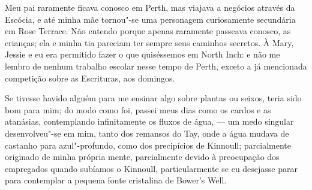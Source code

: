 Meu pai raramente ficava conosco em Perth, mas viajava a negócios
através da Escócia, e até minha mãe tornou"-se uma personagem
curiosamente secundária em Rose Terrace. Não entendo porque apenas
raramente passeava conosco, as crianças; ela e minha tia pareciam ter
sempre seus caminhos secretos. À Mary, Jessie e eu era permitido fazer o
que quiséssemos em North Inch: e não me lembro de nenhum trabalho
escolar nesse tempo de Perth, exceto a já mencionada competição sobre as
Escrituras, aos domingos.

Se tivesse havido alguém para me ensinar algo sobre plantas ou seixos,
teria sido bom para mim; do modo como foi, passei meus dias como os
cardos e as atanásias, contemplando infinitamente os fluxos de água, ---
um medo singular desenvolveu"-se em mim, tanto dos remansos do Tay, onde
a água mudava de castanho para azul"-profundo, como dos precipícios de
Kinnoull; parcialmente originado de minha própria mente, parcialmente
devido à preocupação dos empregados quando subíamos o Kinnoull,
particularmente se eu desejasse parar para contemplar a pequena fonte
cristalina de Bower's Well.

